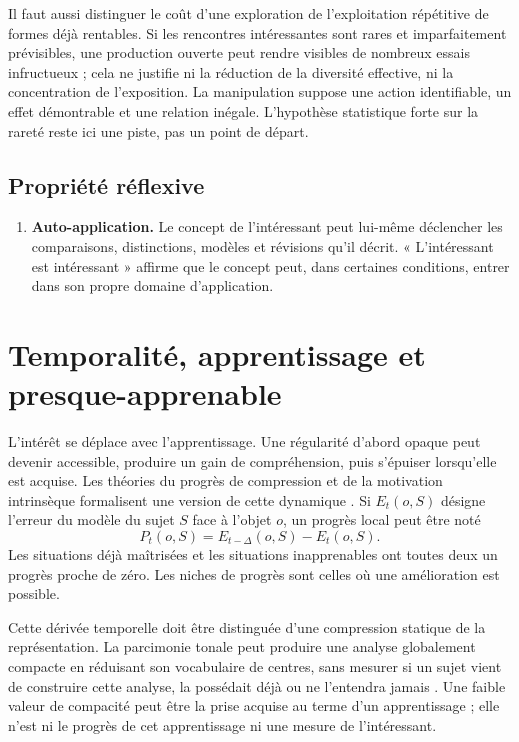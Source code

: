 \documentclass[11pt,a4paper]{article}
\begin{document}
Il faut aussi distinguer le coût d'une exploration de l'exploitation répétitive
de formes déjà rentables. Si les rencontres
intéressantes sont rares et imparfaitement prévisibles, une production ouverte
peut rendre visibles de nombreux essais infructueux ; cela ne justifie ni la
réduction de la diversité effective, ni la concentration de l'exposition. La
manipulation suppose une action identifiable, un effet démontrable et une
relation inégale. L'hypothèse statistique forte sur la rareté reste ici une
piste, pas un point de départ.

\subsection{Propriété réflexive}

\begin{enumerate}[resume]
  \item \textbf{Auto-application.} Le concept de l'intéressant peut lui-même
        déclencher les comparaisons, distinctions, modèles et révisions qu'il
        décrit. « L'intéressant est intéressant » affirme que le concept peut,
        dans certaines conditions, entrer dans son propre domaine
        d'application.
\end{enumerate}

\section{Temporalité, apprentissage et presque-apprenable}

L'intérêt se déplace avec l'apprentissage. Une régularité d'abord opaque peut
devenir accessible, produire un gain de compréhension, puis s'épuiser lorsqu'elle
est acquise. Les théories du progrès de compression et de la motivation
intrinsèque formalisent une version de cette dynamique
\parencite{schmidhuber1997interesting,schmidhuber2009compression,oudeyer2007intrinsic,oudeyer2007typology}.
Si \(E_t(o,S)\) désigne l'erreur du modèle du sujet \(S\) face à l'objet \(o\),
un progrès local peut être noté
\[
  P_t(o,S)=E_{t-\Delta}(o,S)-E_t(o,S).
\]
Les situations déjà maîtrisées et les situations inapprenables ont toutes deux
un progrès proche de zéro. Les niches de progrès sont celles où une amélioration
est possible.

Cette dérivée temporelle doit être distinguée d'une compression statique de la
représentation. La parcimonie tonale peut produire une analyse globalement
compacte en réduisant son vocabulaire de centres, sans mesurer si un sujet vient
de construire cette analyse, la possédait déjà ou ne l'entendra jamais
\parencite{pachet2026tonalparsimony}. Une faible valeur de compacité peut être la
prise acquise au terme d'un apprentissage ; elle n'est ni le progrès de cet
apprentissage ni une mesure de l'intéressant.
\end{document}
